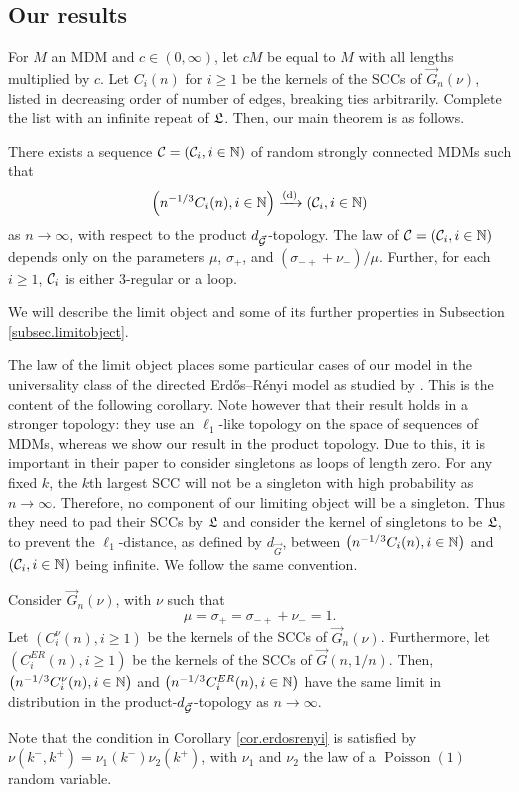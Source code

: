 


\subsection{Our results}

For $M$ an MDM and $c\in (0,\infty)$, let $cM$ be equal to $M$ with all lengths multiplied by $c$. Let $C_i(n)$ for $i\geq 1$ be the kernels of the SCCs of $\vec{G}_n(\nu)$, listed in decreasing order of number of edges, breaking ties arbitrarily. Complete the list with an infinite repeat of $\mathfrak L$. Then, our main theorem is as follows.
\begin{theorem}\label{thm.main}
There exists a sequence ${\mathcal C}=({\mathcal C}_i,i\in {\mathbb N})$ of random strongly connected MDMs such that 
$$\left(n^{-1/3}C_i(n),i\in {\mathbb N}\right)\xrightarrow[]{\mathrm{(d)}}\left({\mathcal C}_i,i\in {\mathbb N}\right)$$
as $n\to \infty$, with respect to the product $d_{\vec{{\mathcal G}}}$-topology. The law of ${\mathcal C}=({\mathcal C}_i,i\in {\mathbb N})$ depends only on the parameters $\mu$, $\sigma_+$, and $(\sigma_{-+}+\nu_-)/\mu$. Further, for each $i\geq 1$, ${\mathcal C}_i$ is either $3$-regular or a loop.
\end{theorem}
We will describe the limit object and some of its further properties in Subsection \ref{subsec.limitobject}.

The law of the limit object places some particular cases of our model in the universality class of the directed Erd\H{o}s--Rényi model as studied by \citet{goldschmidtScalingLimitCritical2019}. This is the content of the following corollary. Note however that their result holds in a stronger topology: they use an $\ell_1$-like topology on the space of sequences of MDMs, whereas we show our result in the product topology. Due to this, it is important in their paper to consider singletons as loops of length zero. For any fixed $k$, the $k$th largest SCC will not be a singleton with high probability as $n \to \infty$. Therefore, no component of our limiting object will be a singleton. Thus they need to pad their SCCs by $\mathfrak L$ and consider the kernel of singletons to be $\mathfrak L$, to prevent the $\ell_1$-distance, as defined by $d_{\vec{G}}$, between $\left(n^{-1/3}C_i(n),i\in {\mathbb N}\right)$ and $\left({\mathcal C}_i,i\in {\mathbb N}\right)$ being infinite. We follow the same convention.

\begin{theorem}\label{cor.erdosrenyi}
Consider $\vec{G}_n(\nu)$, with $\nu$ such that $$\mu=\sigma_+=\sigma_{-+}+\nu_-=1.$$ 
Let $(C^\nu_i(n), i\geq 1)$ be the kernels of the SCCs of $\vec{G}_n(\nu)$. Furthermore, let $(C^{ER}_i(n), i\geq 1)$ be the kernels of the SCCs of $\vec{G}(n,1/n)$. Then, $\left(n^{-1/3}C^\nu_i(n),i\in {\mathbb N}\right)$ and 
$\left(n^{-1/3}C^{ER}_i(n),i\in {\mathbb N}\right)$ have the same limit in distribution in the product-$d_{\vec{{\mathcal G}}}$-topology as $n\to \infty$. 
\end{theorem}
Note that the condition in Corollary \ref{cor.erdosrenyi} is satisfied by $\nu(k^-,k^+)=\nu_1(k^-)\nu_2(k^+)$, with $\nu_1$ and $\nu_2$ the law of a $\operatorname{Poisson}(1)$ random variable.

